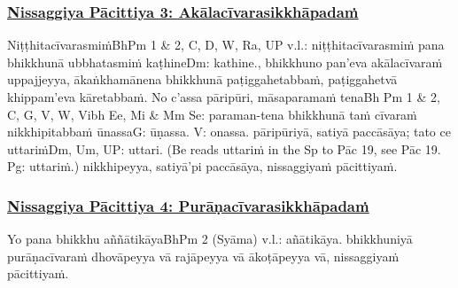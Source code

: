 \subsubsection*{\hyperref[forf-exp3]{Nissaggiya Pācittiya 3: Akālacīvarasikkhāpadaṁ}}
\label{np3}

Niṭṭhitacīvarasmiṁ\makeatletter\hyperlink{endnote-appendix}\makeatother BhPm 1 & 2, C, D, W, Ra, UP v.l.: niṭṭhitacīvarasmiṁ pana bhikkhunā ubbhatasmiṁ kaṭhine\makeatletter\hyperlink{endnote-appendix}\makeatother Dm: kathine., bhikkhuno pan'eva akālacīvaraṁ uppajjeyya, ākaṅkhamānena bhikkhunā paṭiggahetabbaṁ, paṭiggahetvā khippam'eva kāretabbaṁ. No c'assa pāripūri, māsaparamaṁ tena\makeatletter\hyperlink{endnote-appendix}\makeatother Bh Pm 1 & 2, C, G, V, W, Vibh Ee, Mi & Mm Se: paraman-tena bhikkhunā taṁ cīvaraṁ nikkhipitabbaṁ ūnassa\makeatletter\hyperlink{endnote-appendix}\makeatother G: ūṇassa. V: onassa. pāripūriyā, satiyā paccāsāya; tato ce uttariṁ\makeatletter\hyperlink{endnote-appendix}\makeatother Dm, Um, UP: uttari. (Be reads uttariṁ in the Sp to Pāc 19, see Pāc 19. Pg: uttariṁ.) nikkhipeyya, satiyā'pi paccāsāya, nissaggiyaṁ pācittiyaṁ.



\subsubsection*{\hyperref[forf-exp4]{Nissaggiya Pācittiya 4: Purāṇacīvarasikkhāpadaṁ}}
\label{np4}

Yo pana bhikkhu aññātikāya\makeatletter\hyperlink{endnote-appendix}\makeatother BhPm 2 (Syāma) v.l.: añātikāya. bhikkhuniyā purāṇacīvaraṁ dhovāpeyya vā rajāpeyya vā ākoṭāpeyya vā, nissaggiyaṁ pācittiyaṁ.



